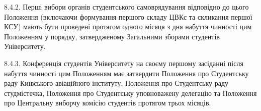     8.4.2. Перші вибори органів студентського самоврядування відповідно до цього Положення (включаючи формування першого складу ЦВКс та скликання першої КСУ) мають бути проведені протягом одного місяця з дня набуття чинності цим Положенням у порядку, затвердженому Загальними зборами студентів Університету.

    8.4.3. Конференція студентів Університету на своєму першому засіданні після набуття чинності цим Положенням має затвердити Положення про Студентську раду Київського авіаційного інституту, Положення про Студентську раду студмістечка, Положення про Студентську уповноважену делегацію та Положення про Центральну виборчу комісію студентів протягом трьох місяців.